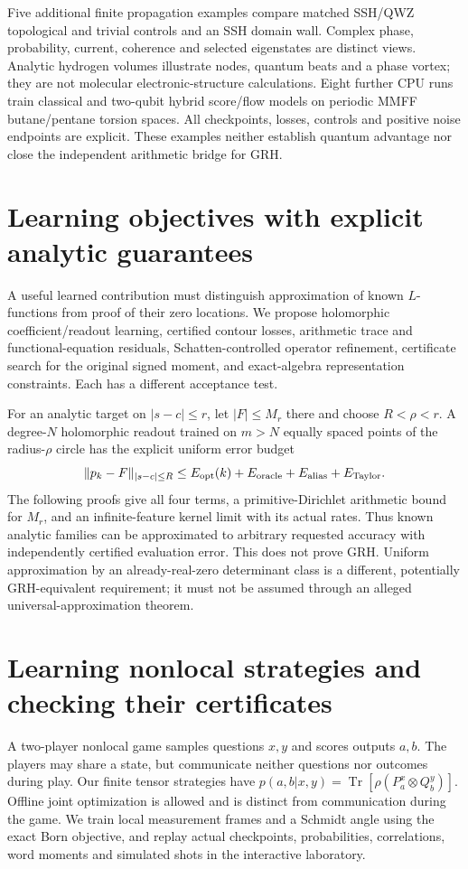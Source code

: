 \documentclass[11pt]{article}
\theoremstyle{definition}\newtheorem{definition}[theorem]{Definition}
\theoremstyle{remark}\newtheorem{remark}[theorem]{Remark}
\begin{document}
Five additional finite propagation examples compare matched SSH/QWZ
topological and trivial controls and an SSH domain wall. Complex phase,
probability, current, coherence and selected eigenstates are distinct views.
Analytic hydrogen volumes illustrate nodes, quantum beats and a phase vortex;
they are not molecular electronic-structure calculations. Eight further CPU
runs train classical and two-qubit hybrid score/flow models on periodic MMFF
butane/pentane torsion spaces. All checkpoints, losses, controls and positive
noise endpoints are explicit. These examples neither establish quantum
advantage nor close the independent arithmetic bridge for GRH.

\section{Learning objectives with explicit analytic guarantees}
A useful learned contribution must distinguish approximation of known
$L$-functions from proof of their zero locations. We propose holomorphic
coefficient/readout learning, certified contour losses, arithmetic trace and
functional-equation residuals, Schatten-controlled operator refinement,
certificate search for the original signed moment, and exact-algebra
representation constraints. Each has a different acceptance test.

For an analytic target on $|s-c|\le r$, let $|F|\le M_r$ there and choose
$R<\rho<r$. A degree-$N$ holomorphic readout trained on $m>N$ equally spaced
points of the radius-$\rho$ circle has the explicit uniform error budget
\[
 \|p_k-F\|_{|s-c|\le R}
 \le E_{\rm opt}(k)+E_{\rm oracle}+E_{\rm alias}+E_{\rm Taylor}.
\]
The following proofs give all four terms, a primitive-Dirichlet arithmetic
bound for $M_r$, and an infinite-feature kernel limit with its actual rates.
Thus known analytic families can be approximated to arbitrary requested
accuracy with independently certified evaluation error. This does not prove
GRH. Uniform approximation by an already-real-zero determinant class is a
different, potentially GRH-equivalent requirement; it must not be assumed
through an alleged universal-approximation theorem.

\section{Learning nonlocal strategies and checking their certificates}
\label{qg:section}
A two-player nonlocal game samples questions $x,y$ and scores outputs $a,b$.
The players may share a state, but communicate neither questions nor outcomes
during play. Our finite tensor strategies have
$p(a,b|x,y)=\operatorname{Tr}[\rho(P_a^x\otimes Q_b^y)]$.
Offline joint optimization is allowed and is distinct from communication
during the game. We train local measurement frames and a Schmidt angle using
the exact Born objective, and replay actual checkpoints, probabilities,
correlations, word moments and simulated shots in the interactive laboratory.
\end{document}
